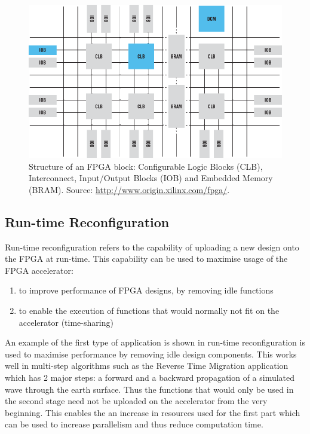 \begin{figure}[ht!]
\centering
\includegraphics[scale=0.4]{figs/fpga-block-structure.png}
\caption{Structure of an FPGA block: Configurable Logic Blocks (CLB),
  Interconnect, Input/Output Blocks (IOB) and Embedded Memory (BRAM). Source:
  \url{http://www.origin.xilinx.com/fpga/}.}
\label{fig:fpga-block-structure}
\end{figure}

\subsection{Run-time Reconfiguration}
\label{sec:run-time-reconfiguration}
Run-time reconfiguration refers to the capability of uploading a new
design onto the FPGA at run-time. This capability can be used to
maximise usage of the FPGA accelerator:
\begin{enumerate}
\item to improve performance of FPGA designs, by removing idle functions
\item to enable the execution of functions that would normally not fit
  on the accelerator (time-sharing)
\end{enumerate}

An example of the first type of application is shown in
\cite{Xinyu:Qiwei:Luk:Qiang:Pell:2012} run-time reconfiguration is
used to maximise performance by removing idle design components. This
works well in multi-step algorithms such as the Reverse Time Migration
application which has 2 major steps: a forward and a backward
propagation of a simulated wave through the earth surface. Thus the
functions that would only be used in the second stage need not be
uploaded on the accelerator from the very beginning. This enables the
an increase in resources used for the first part which can be used to
increase parallelism and thus reduce computation time.


